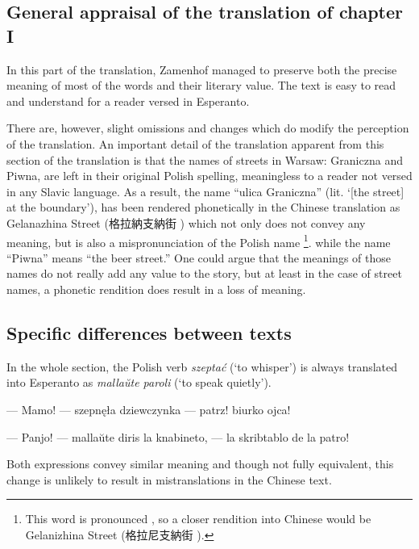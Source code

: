 \subsection{General appraisal of the translation of chapter I}
In this part of the translation, Zamenhof managed to preserve both the precise meaning of most of the words and their literary value. The text is easy to read and understand for a reader versed in Esperanto.

There are, however, slight omissions and changes which do modify the perception of the translation.
An important detail of the translation apparent from this section of the translation is that the names of streets in Warsaw: Graniczna and Piwna, are left in their original Polish spelling, meaningless to a reader not versed in any Slavic language. %
As a result, the name ``ulica Graniczna'' (lit. `[the street] at the boundary'), has been rendered phonetically in the Chinese translation as Gelanazhina Street (格拉納支納街 ) which not only does not convey any meaning, but is also a mispronunciation of the Polish name%
\footnote{This word is pronounced \ipa{[ɡrãˈɲiʧ̑na]}, so a closer rendition into Chinese would be Gelanizhina Street (格拉尼支納街 ).}.
while the name ``Piwna'' means ``the beer street.''
One could argue that the meanings of those names do not really add any value to the story, but at least in the case of street names, a phonetic rendition does result in a loss of meaning.

\subsection{Specific differences between texts}
In the whole section, the Polish verb \textit{szeptać} (`to whisper') is always translated into Esperanto as \textit{mallaŭte paroli} (`to speak quietly').

\begin{displayquote}
--- Mamo! --- szepnęła dziewczynka --- patrz! biurko ojca!
\end{displayquote}

\begin{displayquote}
--- Panjo! --- mallaŭte diris la knabineto, --- la skribtablo de la patro!
\end{displayquote}

Both expressions convey similar meaning and though not fully equivalent, this change is unlikely to result in mistranslations in the Chinese text.

